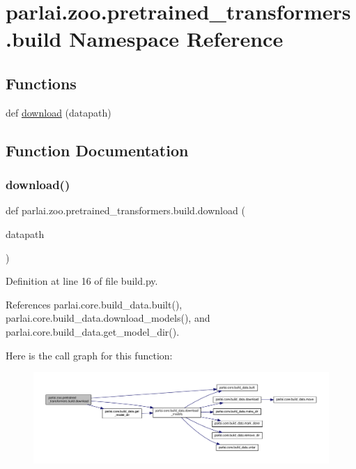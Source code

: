 \hypertarget{namespaceparlai_1_1zoo_1_1pretrained__transformers_1_1build}{}\section{parlai.\+zoo.\+pretrained\+\_\+transformers.\+build Namespace Reference}
\label{namespaceparlai_1_1zoo_1_1pretrained__transformers_1_1build}
\subsection*{Functions}
\begin{DoxyCompactItemize}
\item 
def \hyperlink{namespaceparlai_1_1zoo_1_1pretrained__transformers_1_1build_afaead0deab400e1c516706e85dd4ed9b}{download} (datapath)
\end{DoxyCompactItemize}


\subsection{Function Documentation}
\mbox{\label{namespaceparlai_1_1zoo_1_1pretrained__transformers_1_1build_afaead0deab400e1c516706e85dd4ed9b}} 
\subsubsection{\texorpdfstring{download()}{download()}}
{\footnotesize\ttfamily def parlai.\+zoo.\+pretrained\+\_\+transformers.\+build.\+download (\begin{DoxyParamCaption}\item[{}]{datapath }\end{DoxyParamCaption})}



Definition at line 16 of file build.\+py.



References parlai.\+core.\+build\+\_\+data.\+built(), parlai.\+core.\+build\+\_\+data.\+download\+\_\+models(), and parlai.\+core.\+build\+\_\+data.\+get\+\_\+model\+\_\+dir().

Here is the call graph for this function\+:
\nopagebreak
\begin{figure}[H]
\begin{center}
\leavevmode
\includegraphics[width=350pt]{namespaceparlai_1_1zoo_1_1pretrained__transformers_1_1build_afaead0deab400e1c516706e85dd4ed9b_cgraph}
\end{center}
\end{figure}
